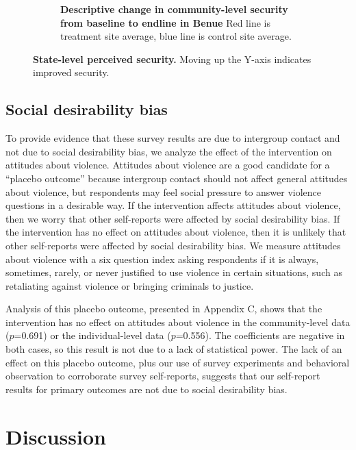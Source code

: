 \documentclass[11pt]{article}
\begin{document}
\begin{figure}[H]
\begin{subfigure}[b]{.48\textwidth}
        \caption{\textbf{Descriptive change in community-level security from baseline to endline in Benue} Red line is treatment site average, blue line is control site average.}
        \label{fig:in_ben}
    \end{subfigure}
    \caption{\textbf{State-level perceived security.}  Moving up the Y-axis indicates improved security.}
\end{figure}

\hypertarget{social-desirability-bias}{%
\subsection{Social desirability bias}\label{social-desirability-bias}}

To provide evidence that these survey results are due to intergroup
contact and not due to social desirability bias, we analyze the effect
of the intervention on attitudes about violence. Attitudes about
violence are a good candidate for a ``placebo outcome'' because
intergroup contact should not affect general attitudes about violence,
but respondents may feel social pressure to answer violence questions in
a desirable way. If the intervention affects attitudes about violence,
then we worry that other self-reports were affected by social
desirability bias. If the intervention has no effect on attitudes about
violence, then it is unlikely that other self-reports were affected by
social desirability bias. We measure attitudes about violence with a six
question index asking respondents if it is always, sometimes, rarely, or
never justified to use violence in certain situations, such as
retaliating against violence or bringing criminals to justice.

Analysis of this placebo outcome, presented in Appendix C, shows that
the intervention has no effect on attitudes about violence in the
community-level data (\(p\)=0.691) or the individual-level data
(\(p\)=0.556). The coefficients are negative in both cases, so this
result is not due to a lack of statistical power. The lack of an effect
on this placebo outcome, plus our use of survey experiments and
behavioral observation to corroborate survey self-reports, suggests that
our self-report results for primary outcomes are not due to social
desirability bias.

\hypertarget{discussion}{%
\section{Discussion}\label{discussion}}
\end{document}
